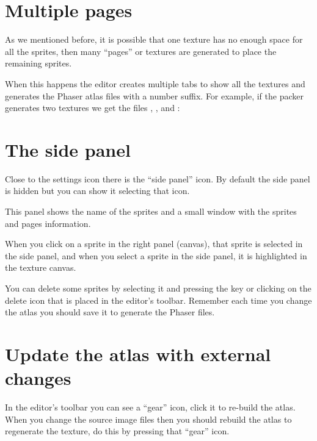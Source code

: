 \documentclass[letterpaper,10pt,english]{sphinxmanual}
\begin{document}
\section{Multiple pages}
\label{\detokenize{texture_packer:multiple-pages}}
As we mentioned before, it is possible that one texture has no enough space for all the sprites, then many “pages” or textures are generated to place the remaining sprites.

When this happens the editor creates multiple tabs to show all the textures and generates the Phaser atlas files with a number suffix. For example, if the packer generates two textures we get the files , ,  and :

\noindent{}


\section{The side panel}
\label{\detokenize{texture_packer:the-side-panel}}
Close to the settings icon there is the “side panel” icon. By default the side panel is hidden but you can show it selecting that icon.

This panel shows the name of the sprites and a small window with the sprites and pages information.

When you click on a sprite in the right panel (canvas), that sprite is selected in the side panel, and when you select a sprite in the side panel, it is highlighted in the texture canvas.

You can delete some sprites by selecting it and pressing the  key or clicking on the delete icon that is placed in the editor’s toolbar. Remember each time you change the atlas you should save it to generate the Phaser files.

\noindent{}


\section{Update the atlas with external changes}
\label{\detokenize{texture_packer:update-the-atlas-with-external-changes}}
In the editor’s toolbar you can see a “gear” icon, click it to re-build the atlas. When you change the source image files then you should rebuild the atlas to regenerate the texture, do this by pressing that “gear” icon.
\end{document}
